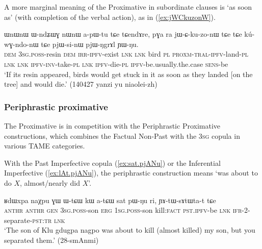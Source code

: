 A more marginal meaning of the Proximative in subordinate clauses is `as soon as' (with completion of the verbal action), as in (\ref{ex:jWCkuzonW}).

 \begin{exe} 
\ex \label{ex:jWCkuzonW}
\gll  ɯnɯnɯ ɯ-ndʑɯɣ nɯnɯ a-pɯ-tu tɕe tɕendɤre, pɣa ra jɯ-ɕ-ku-zo-nɯ tɕe tɕe kú-wɣ-ndo-nɯ tɕe pjɯ-si-nɯ pjɯ-ŋgrɤl ɲɯ-ŋu. \\
\textsc{dem} \textsc{3sg}.\textsc{poss}-resin \textsc{dem} \textsc{irr}-\textsc{ipfv}-exist \textsc{lnk} \textsc{lnk} bird \textsc{pl} \textsc{proxm}-\textsc{tral}-\textsc{ipfv}-land-\textsc{pl} \textsc{lnk} \textsc{lnk} \textsc{ipfv}-\textsc{inv}-take-\textsc{pl} \textsc{lnk} \textsc{ipfv}-die-\textsc{pl} \textsc{ipfv}-be.usually.the.case \textsc{sens}-be \\
\glt `If its resin appeared, birds would get stuck in it as soon as they landed [on the tree] and would die.' (140427 yanzi yu niaolei-zh)
 \end{exe}
 

 
\subsubsection{Periphrastic proximative} \label{sec:proximative.periphrastic}
The Proximative is in competition with the Periphrastic Proximative constructions, which combines the Factual Non-Past with the \textsc{3sg} copula in various TAME categories.

With the Past Imperfective copula  (\ref{ex:sat.pjANu}) or the Inferential Imperfective  (\ref{ex:lAt.pjANu}), the periphrastic construction means `was about to do $X$, almost/nearly did $X$'.

  \begin{exe} 
\ex \label{ex:sat.pjANu}
\gll ʁdɯxpa naχpu ɣɯ ɯ-tɕɯ kɯ a-tɕɯ sat pɯ-ŋu ri, ɲɤ-tɯ-sɤtɯta-t tɕe  \\
\textsc{anthr}  \textsc{anthr} \textsc{gen} \textsc{3sg}.\textsc{poss}-son \textsc{erg} \textsc{1sg}.\textsc{poss}-son kill:\textsc{fact} \textsc{pst}.\textsc{ipfv}-be \textsc{lnk} \textsc{ifr}-2-separate-\textsc{pst}:\textsc{tr} \textsc{lnk} \\
\glt `The son of Klu gdugpa nagpo was about to kill (almost killed) my son, but you separated them.' (28-smAnmi)
 \end{exe}
 

